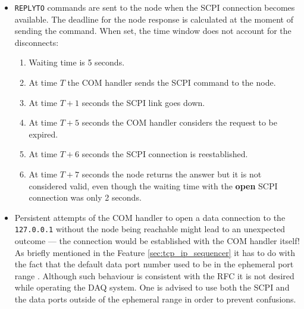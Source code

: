 \begin{itemize}
	\item{
		\texttt{REPLYTO} commands are sent to the node when the SCPI connection becomes available. The deadline for the node response is calculated at the moment of sending the command. When set, the time window does not account for the disconnects:
		\begin{enumerate}
			\item Waiting time is 5 seconds.
			\item At time $T$ the COM handler sends the SCPI command to the node.
			\item At time $T + 1$ seconds the SCPI link goes down.
			\item At time $T + 5$ seconds the COM handler considers the request to be expired.
			\item At time $T + 6$ seconds the SCPI connection is reestablished.
			\item At time $T + 7$ seconds the node returns the answer but it is not considered valid, even though the waiting time with the \textbf{open} SCPI connection was only 2 seconds.
		\end{enumerate}
	}
	\item Persistent attempts of the COM handler to open a data connection to the \texttt{127.0.0.1} without the node being reachable might lead to an unexpected outcome --- the connection would be established with the COM handler itself! As briefly mentioned in the Feature \ref{sec:tcp_ip_sequencer} it has to do with the fact that the default data port number used to be in the ephemeral port range \cite{RichardStevens1998}. Although such behaviour is consistent with the RFC \cite{Postel1981} it is not desired while operating the DAQ system. One is advised to use both the SCPI and the data ports outside of the ephemeral range in order to prevent confusions.
\end{itemize}